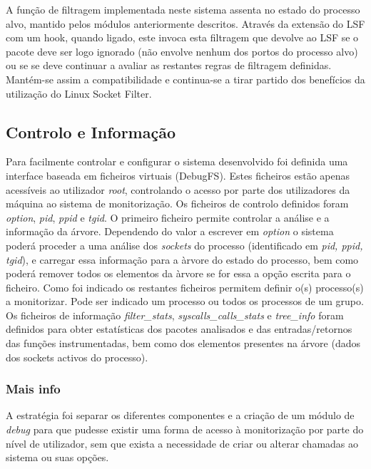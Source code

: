 A função de filtragem  implementada neste sistema assenta no estado do processo alvo, mantido pelos módulos anteriormente descritos.
Através da extensão do LSF com um hook, quando ligado, este invoca esta filtragem que devolve ao LSF se o pacote deve ser logo ignorado (não envolve nenhum dos portos do processo alvo) ou se se deve continuar a avaliar as restantes regras de filtragem definidas.
 Mantém-se assim a compatibilidade e continua-se a tirar partido dos benefícios da utilização do Linux Socket Filter.



\subsection*{Controlo e Informação}
\label{sub:data_information}

Para facilmente controlar e configurar o sistema desenvolvido foi definida uma interface baseada em ficheiros virtuais (DebugFS).
 Estes ficheiros estão apenas acessíveis ao utilizador \textit{root}, controlando o acesso por parte dos utilizadores da máquina ao sistema de monitorização.
 Os ficheiros de controlo definidos foram \textit{option}, \textit{pid}, \textit{ppid} e \textit{tgid}.
 O primeiro ficheiro permite controlar a análise e a informação da árvore.
 Dependendo do valor a escrever em \textit{option} o sistema poderá proceder a uma análise dos \textit{sockets} do processo (identificado em \textit{pid, ppid, tgid}), e carregar essa informação para a àrvore do estado do processo, bem como poderá remover todos os elementos da àrvore se for essa a opção escrita para o ficheiro.
 Como foi indicado os restantes ficheiros permitem definir o(s) processo(s) a monitorizar.
 Pode ser indicado um processo ou todos os processos de um grupo.
 Os ficheiros de informação \textit{filter\_stats}, \textit{syscalls\_calls\_stats} e \textit{tree\_info} foram definidos para obter estatísticas dos pacotes analisados e das entradas/retornos das funções instrumentadas, bem como dos elementos presentes na árvore (dados dos sockets activos do processo).

\subsubsection*{Mais info}
A estratégia foi separar os diferentes componentes e a criação de um módulo de \textit{debug} para que pudesse existir uma forma de acesso à monitorização por parte do nível de utilizador, sem que exista a necessidade de criar ou alterar chamadas ao sistema ou suas opções.

